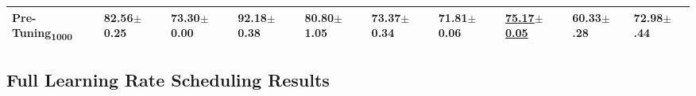 \documentclass{article} %
\begin{document}
\begin{center}
\begin{sideways}
\begin{minipage}{0.9\textheight}
\begin{tabular}{llllllllll}
            Pre-Tuning\textsubscript{1000} & \bfseries 82.56$\pm$0.25 & 73.30$\pm$0.00           & 92.18$\pm$0.38           & 80.80$\pm$1.05             & \bfseries 73.37$\pm$0.34   & \bfseries 71.81$\pm$0.06 & \underline{75.17$\pm$0.05} & 60.33$\pm$.28            & 72.98$\pm$.44            \\
            \bottomrule
         \end{tabular}
      \end{minipage}
   \end{sideways}
\end{center}

\newpage
\subsection{Full Learning Rate Scheduling Results}\label{app:scheduling_results}

\vfill
\end{document}
